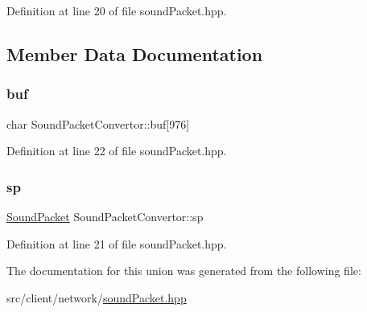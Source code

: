 Definition at line 20 of file sound\+Packet.\+hpp.



\subsection{Member Data Documentation}
\mbox{\label{union_sound_packet_convertor_a7d79a8e116c1a519b05e57f88890bba6}} 
\subsubsection{\texorpdfstring{buf}{buf}}
{\footnotesize\ttfamily char Sound\+Packet\+Convertor\+::buf\mbox{[}976\mbox{]}}



Definition at line 22 of file sound\+Packet.\+hpp.

\mbox{\label{union_sound_packet_convertor_ab2b19fa80fbc7219bcd7e6d4818d0525}} 
\subsubsection{\texorpdfstring{sp}{sp}}
{\footnotesize\ttfamily \mbox{\hyperlink{struct_sound_packet}{Sound\+Packet}} Sound\+Packet\+Convertor\+::sp}



Definition at line 21 of file sound\+Packet.\+hpp.



The documentation for this union was generated from the following file\+:\begin{DoxyCompactItemize}
\item 
src/client/network/\mbox{\hyperlink{sound_packet_8hpp}{sound\+Packet.\+hpp}}\end{DoxyCompactItemize}
